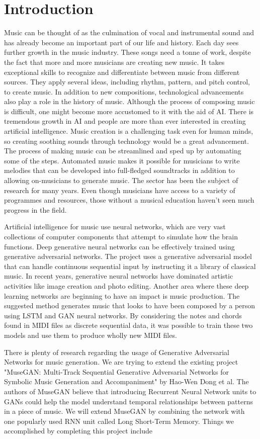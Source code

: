 \documentclass[letterpaper]{article}
\begin{document}
\section{Introduction}
Music can be thought of as the culmination of vocal and instrumental sound and has already become an important part of our life and history. Each day sees further growth in the music industry. These songs need a tonne of work, despite the fact that more and more musicians are creating new music. It takes exceptional skills to recognize and differentiate between music from different sources. They apply several ideas, including rhythm, pattern, and pitch control, to create music. In addition to new compositions, technological advancements also play a role in the history of music. Although the process of composing music is difficult, one might become more accustomed to it with the aid of AI. There is tremendous growth in AI and people are more than ever interested in creating artificial intelligence. Music creation is a challenging task even for human minds, so creating soothing sounds through technology would be a great advancement. The process of making music can be streamlined and sped up by automating some of the steps. Automated music makes it possible for musicians to write melodies that can be developed into full-fledged soundtracks in addition to allowing on-musicians to generate music. The sector has been the subject of research for many years. Even though musicians have access to a variety of programmes and resources, those without a musical education haven't seen much progress in the field.

Artificial intelligence for music use neural networks, which are very vast collections of computer components that attempt to simulate how the brain functions. Deep generative neural networks can be effectively trained using generative adversarial networks. The project uses a generative adversarial model that can handle continuous sequential input by instructing it a library of classical music. In recent years, generative neural networks have dominated artistic activities like image creation and photo editing. Another area where these deep learning networks are beginning to have an impact is music production. The suggested method generates music that looks to have been composed by a person using LSTM and GAN neural networks. By considering the notes and chords found in MIDI files as discrete sequential data, it was possible to train these two models and use them to produce wholly new MIDI files.

There is plenty of research regarding the usage of Generative Adversarial Networks for music generation. We are trying to extend the existing project "MuseGAN: Multi-Track Sequential Generative Adversarial Networks for Symbolic Music Generation and Accompaniment" by Hao-Wen Dong et al. The authors of MuseGAN believe that introducing Recurrent Neural Network units to GANs could help the model understand temporal relationships between patterns in a piece of music. We will extend MuseGAN by combining the network with one popularly used RNN unit called Long Short-Term Memory. Things we accomplished by completing this project include
\end{document}
